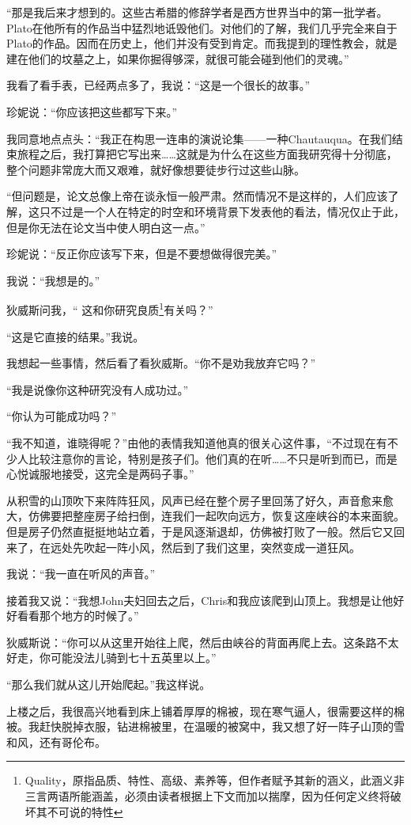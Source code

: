 \documentclass[UTF8]{article}
\begin{document}
\par “那是我后来才想到的。这些古希腊的修辞学者是西方世界当中的第一批学者。Plato在他所有的作品当中猛烈地诋毁他们。对他们的了解，我们几乎完全来自于Plato的作品。因而在历史上，他们并没有受到肯定。而我提到的理性教会，就是建在他们的坟墓之上，如果你掘得够深，就很可能会碰到他们的灵魂。”
\par 我看了看手表，已经两点多了，我说：“这是一个很长的故事。”
\par 珍妮说：“你应该把这些都写下来。”
\par 我同意地点点头：“我正在构思一连串的演说论集——一种Chautauqua。在我们结束旅程之后，我打算把它写出来……这就是为什么在这些方面我研究得十分彻底，整个问题非常庞大而又艰难，就好像想要徒步行过这些山脉。
\par “但问题是，论文总像上帝在谈永恒一般严肃。然而情况不是这样的，人们应该了解，这只不过是一个人在特定的时空和环境背景下发表他的看法，情况仅止于此，但是你无法在论文当中使人明白这一点。”
\par 珍妮说：“反正你应该写下来，但是不要想做得很完美。”
\par 我说：“我想是的。”
\par 狄威斯问我，“ 这和你研究良质\footnote{Quality，原指品质、特性、高级、素养等，但作者赋予其新的涵义，此涵义非三言两语所能涵盖，必须由读者根据上下文而加以揣摩，因为任何定义终将破坏其不可说的特性}有关吗？”
\par “这是它直接的结果。”我说。
\par 我想起一些事情，然后看了看狄威斯。“你不是劝我放弃它吗？”
\par “我是说像你这种研究没有人成功过。”
\par “你认为可能成功吗？”
\par “我不知道，谁晓得呢？”由他的表情我知道他真的很关心这件事，“不过现在有不少人比较注意你的言论，特别是孩子们。他们真的在听……不只是听到而已，而是心悦诚服地接受，这完全是两码子事。”
\par 从积雪的山顶吹下来阵阵狂风，风声已经在整个房子里回荡了好久，声音愈来愈大，仿佛要把整座房子给扫倒，连我们一起吹向远方，恢复这座峡谷的本来面貌。但是房子仍然直挺挺地站立着，于是风逐渐退却，仿佛被打败了一般。然后它又回来了，在远处先吹起一阵小风，然后到了我们这里，突然变成一道狂风。
\par 我说：“我一直在听风的声音。”
\par 接着我又说：“我想John夫妇回去之后，Chris和我应该爬到山顶上。我想是让他好好看看那个地方的时候了。”
\par 狄威斯说：“你可以从这里开始往上爬，然后由峡谷的背面再爬上去。这条路不太好走，你可能没法儿骑到七十五英里以上。”
\par “那么我们就从这儿开始爬起。”我这样说。
\par 上楼之后，我很高兴地看到床上铺着厚厚的棉被，现在寒气逼人，很需要这样的棉被。我赶快脱掉衣服，钻进棉被里，在温暖的被窝中，我又想了好一阵子山顶的雪和风，还有哥伦布。
\end{document}
